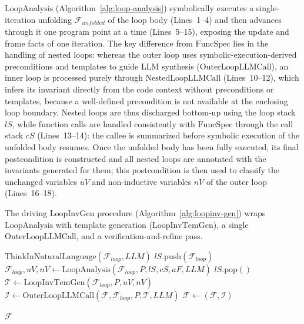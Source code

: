 $\mathrm{LoopAnalysis}$ (Algorithm~\ref{alg:loop-analysis}) symbolically executes a single-iteration unfolding $\mathcal{F}_{\textit{unfolded}}$ of the loop body (Lines~1--4) and then advances through it one program point at a time (Lines~5--15), exposing the update and frame facts of one iteration. The key difference from $\mathrm{FuncSpec}$ lies in the handling of nested loops: whereas the outer loop uses symbolic-execution-derived preconditions and templates to guide LLM synthesis ($\mathrm{OuterLoopLLMCall}$), an inner loop is processed purely through $\mathrm{NestedLoopLLMCall}$ (Lines~10--12), which infers its invariant directly from the code context without preconditions or templates, because a well-defined precondition is not available at the enclosing loop boundary. Nested loops are thus discharged bottom-up using the loop stack $\textit{lS}$, while function calls are handled consistently with $\mathrm{FuncSpec}$ through the call stack $\textit{cS}$ (Lines~13--14): the callee is summarized before symbolic execution of the unfolded body resumes. Once the unfolded body has been fully executed, its final postcondition is constructed and all nested loops are annotated with the invariants generated for them; this postcondition is then used to classify the unchanged variables $\textit{uV}$ and non-inductive variables $\textit{nV}$ of the outer loop (Lines~16--18).

The driving $\mathrm{LoopInvGen}$ procedure (Algorithm~\ref{alg:loopinv-gen}) wraps $\mathrm{LoopAnalysis}$ with template generation ($\mathrm{LoopInvTemGen}$), a single $\mathrm{OuterLoopLLMCall}$, and a verification-and-refine pass.

\begin{algorithm}[htbp]
\caption{Loop Invariant Generation $\mathrm{LoopInvGen}$}
\label{alg:loopinv-gen}
\small
{}

$\mathrm{ThinkInNaturalLanguage}(\mathcal{F}_{\textit{loop}},\textit{LLM})$\;
$\textit{lS}.\mathrm{push}(\mathcal{F}_{\textit{loop}})$\;
$\mathcal{F}_{\textit{loop}}, \textit{uV}, \textit{nV} \gets \mathrm{LoopAnalysis}(\mathcal{F}_{\textit{loop}},P,\textit{lS},\textit{cS},\textit{aF},\textit{LLM})$\;
$\textit{lS}.\mathrm{pop}()$
$\mathcal{T} \gets \mathrm{LoopInvTemGen}(\mathcal{F}_{\textit{loop}},P,\textit{uV},\textit{nV})$\;
$\mathcal{I} \gets \mathrm{OuterLoopLLMCall}(\mathcal{F},\mathcal{F}_{\textit{loop}},P,\mathcal{T},\textit{LLM})$\;
$\mathcal{F} \gets (\mathcal{F},\mathcal{I})$\;


\Return $\mathcal{F}$\;
\end{algorithm}
